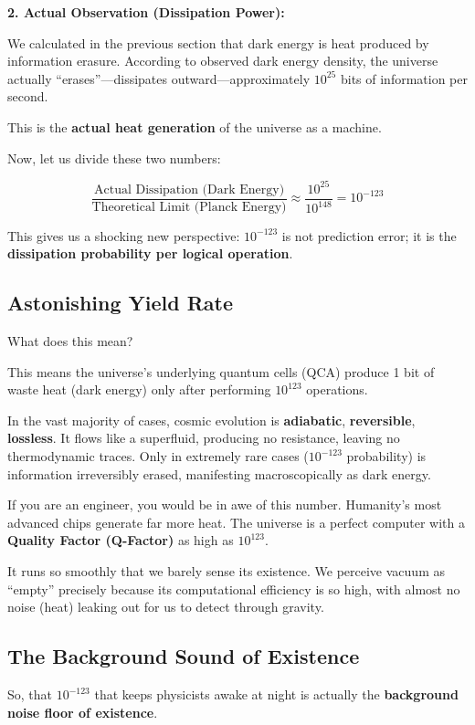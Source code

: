 \textbf{2. Actual Observation (Dissipation Power):}

We calculated in the previous section that dark energy is heat produced by information erasure. According to observed dark energy density, the universe actually ``erases''---dissipates outward---approximately $10^{25}$ bits of information per second.

This is the \textbf{actual heat generation} of the universe as a machine.

Now, let us divide these two numbers:

$$\frac{\text{Actual Dissipation (Dark Energy)}}{\text{Theoretical Limit (Planck Energy)}} \approx \frac{10^{25}}{10^{148}} = 10^{-123}$$

This gives us a shocking new perspective: $10^{-123}$ is not prediction error; it is the \textbf{dissipation probability per logical operation}.

\subsection{Astonishing Yield Rate}

What does this mean?

This means the universe's underlying quantum cells (QCA) produce 1 bit of waste heat (dark energy) only after performing $10^{123}$ operations.

In the vast majority of cases, cosmic evolution is \textbf{adiabatic}, \textbf{reversible}, \textbf{lossless}. It flows like a superfluid, producing no resistance, leaving no thermodynamic traces. Only in extremely rare cases ($10^{-123}$ probability) is information irreversibly erased, manifesting macroscopically as dark energy.

If you are an engineer, you would be in awe of this number. Humanity's most advanced chips generate far more heat. The universe is a perfect computer with a \textbf{Quality Factor (Q-Factor)} as high as $10^{123}$.

It runs so smoothly that we barely sense its existence. We perceive vacuum as ``empty'' precisely because its computational efficiency is so high, with almost no noise (heat) leaking out for us to detect through gravity.

\subsection{The Background Sound of Existence}

So, that $10^{-123}$ that keeps physicists awake at night is actually the \textbf{background noise floor of existence}.

